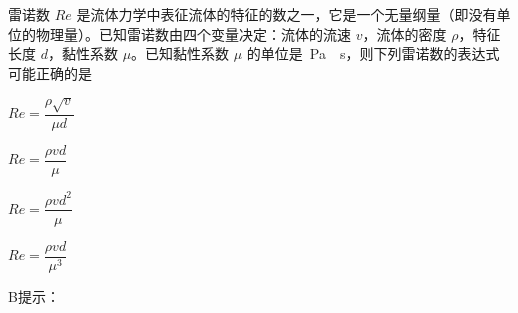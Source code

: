 雷诺数 \(Re\) 是流体力学中表征流体的特征的数之一，它是一个无量纲量（即没有单位的物理量）。已知雷诺数由四个变量决定：流体的流速 \(v\)，流体的密度 \(\rho\)，特征长度 \(d\)，黏性系数 \(\mu\)。已知黏性系数 \(\mu\) 的单位是\qty{}{Pa\cdot s}，则下列雷诺数的表达式可能正确的是\paren[]
\begin{choices}
	\item \(Re = \dfrac{\rho \sqrt{v}}{\mu d}\)
	\item \(Re = \dfrac{\rho v d}{\mu}\)
	\item \(Re = \dfrac{\rho v d^2}{\mu}\)
	\item \(Re = \dfrac{\rho v d}{\mu^3}\)
\end{choices}
\begin{answer}
    B\qquad 提示：
\end{answer}